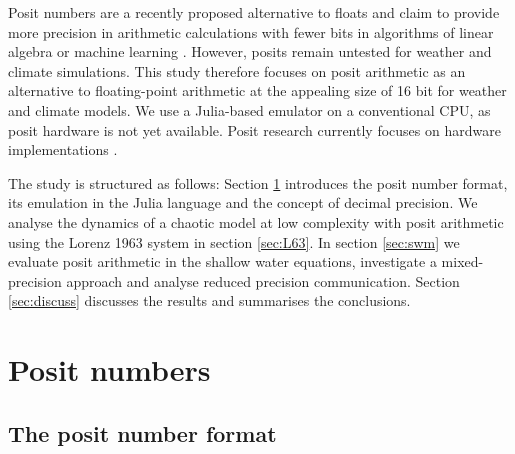 \documentclass[draft]{agujournal2019}
\begin{document}
Posit numbers are a recently proposed alternative to floats and claim to provide more precision in arithmetic calculations with fewer bits in algorithms of linear algebra or machine learning \cite{Gustafson2017}. However, posits remain untested for weather and climate simulations. This study therefore focuses on posit arithmetic as an alternative to floating-point arithmetic at the appealing size of 16 bit for weather and climate models. We use a Julia-based emulator on a conventional CPU, as posit hardware is not yet available. Posit research currently focuses on hardware implementations \cite{VanDam2018,Chen2018,Chaurasiya2018,Glaser2017}.

The study  is structured as follows: Section \ref{sec:posits} introduces the posit number format, its emulation in the Julia language and the concept of decimal precision. We analyse the dynamics of a chaotic model at low complexity with posit arithmetic using the Lorenz 1963 system in section \ref{sec:L63}. In section \ref{sec:swm} we evaluate posit arithmetic in the shallow water equations, investigate a mixed-precision approach and analyse reduced precision communication. Section \ref{sec:discuss} discusses the results and summarises the conclusions.

\section{Posit numbers}
\label{sec:posits}
\subsection{The posit number format}
\label{sec:posit_methods}
\end{document}

